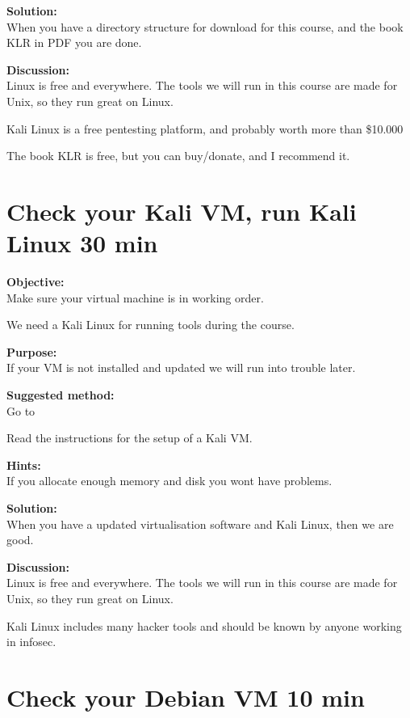 \documentclass[a4paper,11pt,notitlepage]{report}
\begin{document}
{\bf Solution:}\\
When you have a directory structure for download for this course, and the book KLR in PDF you are done.

{\bf Discussion:}\\
Linux is free and everywhere. The tools we will run in this course are made for Unix, so they run great on Linux.

Kali Linux is a free pentesting platform, and probably worth more than \$10.000

The book KLR is free, but you can buy/donate, and I recommend it.

\chapter{Check your Kali VM, run Kali Linux 30 min}
\label{ex:basicVM}


{\bf Objective:}\\
Make sure your virtual machine is in working order.

We need a Kali Linux for running tools during the course.

{\bf Purpose:}\\
If your VM is not installed and updated we will run into trouble later.

{\bf Suggested method:}\\
Go to 

Read the instructions for the setup of a Kali VM.

{\bf Hints:}\\
If you allocate enough memory and disk you wont have problems.

{\bf Solution:}\\
When you have a updated virtualisation software and Kali Linux, then we are good.

{\bf Discussion:}\\
Linux is free and everywhere. The tools we will run in this course are made for Unix, so they run great on Linux.

Kali Linux includes many hacker tools and should be known by anyone working in infosec.

\chapter{Check your Debian VM 10 min}
\label{ex:basicDebianVM}
\end{document}
